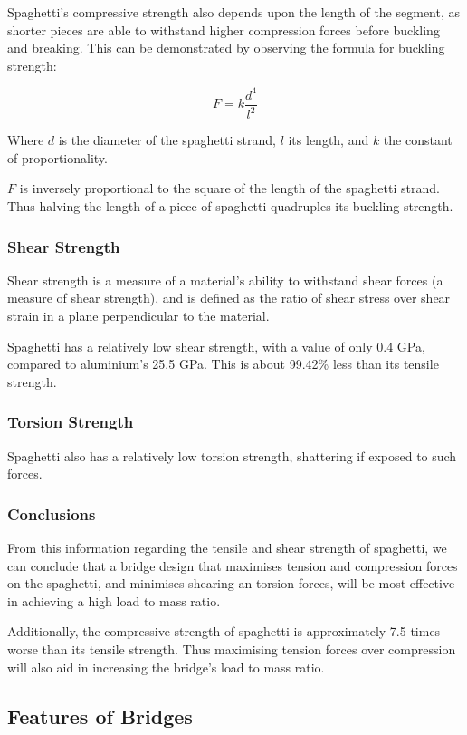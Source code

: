 \documentclass[a4paper,11pt]{article}
\begin{document}
Spaghetti's compressive strength also depends upon the length of the segment, as
shorter pieces are able to withstand higher compression forces before buckling
and breaking.
This can be demonstrated by observing the formula for buckling strength:

$$
F = k \frac{d^4}{l^2}
$$

Where $d$ is the diameter of the spaghetti strand, $l$ its length, and $k$ the
constant of proportionality.

$F$ is inversely proportional to the square of the length of the spaghetti
strand.
Thus halving the length of a piece of spaghetti quadruples its buckling
strength.


\subsubsection{Shear Strength}

Shear strength is a measure of a material's ability to withstand shear forces (a
measure of shear strength), and is defined as the ratio of shear stress over
shear strain in a plane perpendicular to the material.

Spaghetti has a relatively low shear strength, with a value of only 0.4 GPa,
compared to aluminium's 25.5 GPa.
This is about 99.42\% less than its tensile strength.


\subsubsection{Torsion Strength}

Spaghetti also has a relatively low torsion strength, shattering if exposed to
such forces.


\subsubsection{Conclusions}

From this information regarding the tensile and shear strength of spaghetti, we
can conclude that a bridge design that maximises tension and compression forces
on the spaghetti, and minimises shearing an torsion forces, will be most
effective in achieving a high load to mass ratio.

Additionally, the compressive strength of spaghetti is approximately 7.5 times
worse than its tensile strength. Thus maximising tension forces over compression
will also aid in increasing the bridge's load to mass ratio.


\subsection{Features of Bridges}
\end{document}
